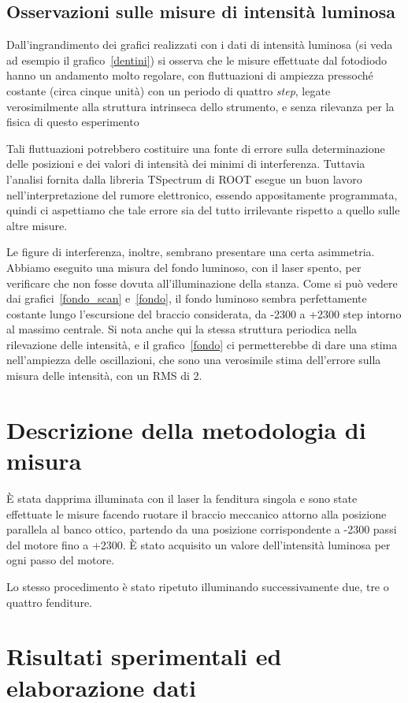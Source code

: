 \documentclass[italian,a4paper]{article}
\begin{document}
\subsection*{Osservazioni sulle misure di intensità luminosa}
Dall'ingrandimento dei grafici realizzati con i dati di intensità luminosa (si veda ad esempio il grafico~\ref{dentini}) si osserva che le misure effettuate dal fotodiodo hanno un andamento molto regolare, con fluttuazioni di ampiezza pressoché costante (circa cinque unità) con un periodo di quattro \emph{step}, legate verosimilmente alla struttura intrinseca dello strumento, e senza rilevanza per la fisica di questo esperimento

Tali fluttuazioni potrebbero costituire una fonte di errore sulla determinazione delle posizioni e dei valori di intensità dei minimi di interferenza. Tuttavia l'analisi fornita dalla libreria TSpectrum di ROOT esegue un buon lavoro nell'interpretazione del rumore elettronico, essendo appositamente programmata, quindi ci aspettiamo che tale errore sia del tutto irrilevante rispetto a quello sulle altre misure.

Le figure di interferenza, inoltre, sembrano presentare una certa asimmetria. Abbiamo eseguito una misura del fondo luminoso, con il laser spento, per verificare che non fosse dovuta all'illuminazione della stanza. Come si può vedere dai grafici~\ref{fondo_scan} e~\ref{fondo}, il fondo luminoso sembra perfettamente costante lungo l'escursione del braccio considerata, da -2300 a +2300 step intorno al massimo centrale. Si nota anche qui la stessa struttura periodica nella rilevazione delle intensità, e il grafico~\ref{fondo} ci permetterebbe di dare una stima nell'ampiezza delle oscillazioni, che sono una verosimile stima dell'errore sulla misura delle intensità, con un RMS di 2.

\section{Descrizione della metodologia di misura}
\`{E} stata dapprima illuminata con il laser la fenditura singola e sono state effettuate le misure facendo ruotare il braccio meccanico attorno alla posizione parallela al banco ottico, partendo da una posizione corrispondente a -2300 passi del motore fino a +2300. \`{E} stato acquisito un valore dell'intensità luminosa per ogni passo del motore.

Lo stesso procedimento è stato ripetuto illuminando successivamente due, tre o quattro fenditure.
\section{Risultati sperimentali ed elaborazione dati}
\end{document}
